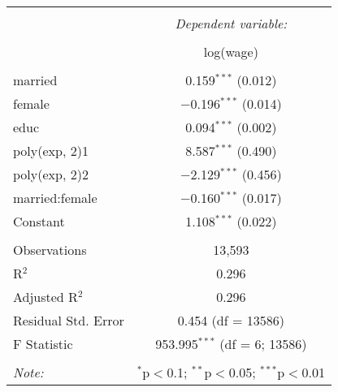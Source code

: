 
\begin{tabular}{@{\extracolsep{5pt}}lc} 
\\[-1.8ex]\hline 
\hline \\[-1.8ex] 
 & \multicolumn{1}{c}{\textit{Dependent variable:}} \\ 
\cline{2-2} 
\\[-1.8ex] & log(wage) \\ 
\hline \\[-1.8ex] 
 married & 0.159$^{***}$ (0.012) \\ 
  female & $-$0.196$^{***}$ (0.014) \\ 
  educ & 0.094$^{***}$ (0.002) \\ 
  poly(exp, 2)1 & 8.587$^{***}$ (0.490) \\ 
  poly(exp, 2)2 & $-$2.129$^{***}$ (0.456) \\ 
  married:female & $-$0.160$^{***}$ (0.017) \\ 
  Constant & 1.108$^{***}$ (0.022) \\ 
 \hline \\[-1.8ex] 
Observations & 13,593 \\ 
R$^{2}$ & 0.296 \\ 
Adjusted R$^{2}$ & 0.296 \\ 
Residual Std. Error & 0.454 (df = 13586) \\ 
F Statistic & 953.995$^{***}$ (df = 6; 13586) \\ 
\hline 
\hline \\[-1.8ex] 
\textit{Note:}  & \multicolumn{1}{r}{$^{*}$p$<$0.1; $^{**}$p$<$0.05; $^{***}$p$<$0.01} \\ 
\end{tabular} 
